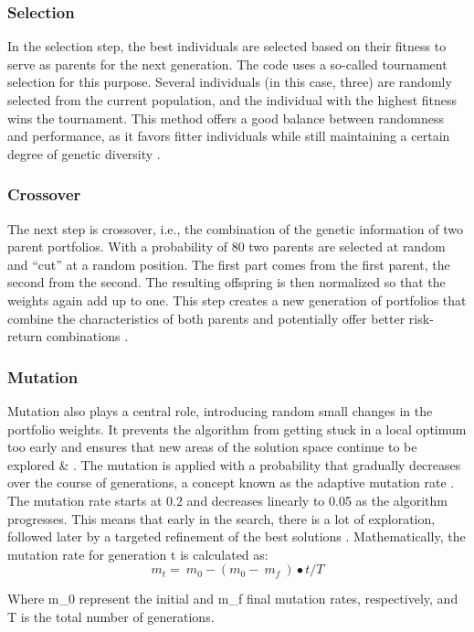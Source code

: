 \documentclass{agasthesis}
\begin{document}
\subsubsection{Selection}
In the selection step, the best individuals are selected based on their fitness to serve as parents for the next generation. The code uses a so-called tournament selection for this purpose. 
Several individuals (in this case, three) are randomly selected from the current population, and the individual with the highest fitness wins the tournament. This method offers a good balance 
between randomness and performance, as it favors fitter individuals while still maintaining a certain degree of genetic diversity \cite[p. 193]{miller_genetic_1995}. 
\subsubsection{Crossover}
The next step is crossover, i.e., the combination of the genetic information of two parent portfolios. With a probability of 80%
two parents are selected at random and “cut” at a random position. The first part comes from the first parent, the second from the second. 
The resulting offspring is then normalized so that the weights again add up to one. This step creates a new generation of portfolios that combine 
the characteristics of both parents and potentially offer better risk-return combinations \cite[p. 8-9]{melanie_introduction_1999}.
\subsubsection{Mutation}
Mutation also plays a central role, introducing random small changes in the portfolio weights. It prevents the algorithm from getting stuck in a local 
optimum too early and ensures that new areas of the solution space continue to be explored \cite[p. 129-130]{melanie_introduction_1999} & \cite[p. 471]{kalayci_review_2017}. 
The mutation is applied with a probability that gradually decreases over the course of generations, a concept known as the adaptive mutation rate \cite[p. 181]{rajakumar_static_2013}. 
The mutation rate starts at 0.2 and decreases linearly to 0.05 as the algorithm progresses. This means that early in the search, there is a lot of exploration, followed later 
by a targeted refinement of the best solutions \cite[p. 181]{rajakumar_static_2013}. Mathematically, the mutation rate for generation t is calculated as:
\[
m_t=\ m_0-(m_0-\ m_f\ )\bullet t/T
\]

Where m_0 represent the initial and m_f final mutation rates, respectively, and T is the total number of generations.
\end{document}
